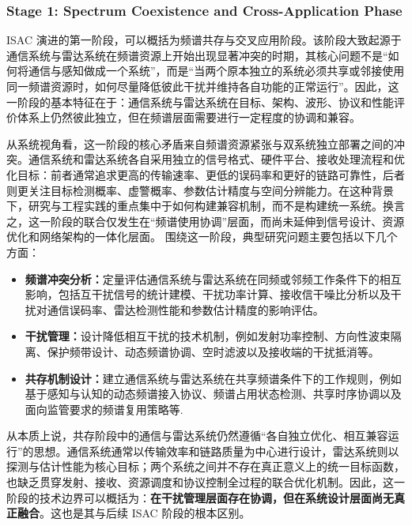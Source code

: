 \subsubsection{Stage 1: Spectrum Coexistence and Cross-Application Phase}
\label{subsubsec:ch1-stage1}

ISAC 演进的第一阶段，可以概括为频谱共存与交叉应用阶段。该阶段大致起源于通信系统与雷达系统在频谱资源上开始出现显著冲突的时期，其核心问题不是“如何将通信与感知做成一个系统”，而是“当两个原本独立的系统必须共享或邻接使用同一频谱资源时，如何尽量降低彼此干扰并维持各自功能的正常运行”\cite{Liu2020JointRadarComm,Chiriyath2017RadarCommCoexistence}。因此，这一阶段的基本特征在于：通信系统与雷达系统在目标、架构、波形、协议和性能评价体系上仍然彼此独立，但在频谱层面需要进行一定程度的协调和兼容。

从系统视角看，这一阶段的核心矛盾来自频谱资源紧张与双系统独立部署之间的冲突。通信系统和雷达系统各自采用独立的信号格式、硬件平台、接收处理流程和优化目标：前者通常追求更高的传输速率、更低的误码率和更好的链路可靠性，后者则更关注目标检测概率、虚警概率、参数估计精度与空间分辨能力。在这种背景下，研究与工程实践的重点集中于如何构建兼容机制，而不是构建统一系统\cite{ITU_R_RR2024}。换言之，这一阶段的联合仅发生在“频谱使用协调”层面，而尚未延伸到信号设计、资源优化和网络架构的一体化层面。
围绕这一阶段，典型研究问题主要包括以下几个方面：
\begin{itemize}
    \item \textbf{频谱冲突分析：}定量评估通信系统与雷达系统在同频或邻频工作条件下的相互影响，包括互干扰信号的统计建模、干扰功率计算、接收信干噪比分析以及干扰对通信误码率、雷达检测性能和参数估计精度的影响评估\cite{Chiriyath2017RadarCommCoexistence}。
    \item \textbf{干扰管理：}设计降低相互干扰的技术机制，例如发射功率控制、方向性波束隔离、保护频带设计、动态频谱协调、空时滤波以及接收端的干扰抵消等\cite{Liu2020JointRadarComm}。
    \item \textbf{共存机制设计：}建立通信系统与雷达系统在共享频谱条件下的工作规则，例如基于感知与认知的动态频谱接入协议、频谱占用状态检测、共享时序协调以及面向监管要求的频谱复用策略等\cite{Chiriyath2017RadarCommCoexistence}.
\end{itemize}
从本质上说，共存阶段中的通信与雷达系统仍然遵循“各自独立优化、相互兼容运行”的思想。通信系统通常以传输效率和链路质量为中心进行设计，雷达系统则以探测与估计性能为核心目标；两个系统之间并不存在真正意义上的统一目标函数，也缺乏贯穿发射、接收、资源调度和协议控制全过程的联合优化机制。因此，这一阶段的技术边界可以概括为：\textbf{在干扰管理层面存在协调，但在系统设计层面尚无真正融合}。这也是其与后续 ISAC 阶段的根本区别。

